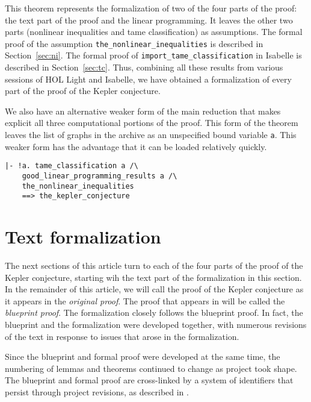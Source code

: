 This theorem represents the formalization of two of the four parts of
the proof: the text part of the proof and the linear programming.  It
leaves the other two parts (nonlinear inequalities and tame
classification) as assumptions.  The formal proof of the assumption
\verb!the_nonlinear_inequalities! is described in
Section~\ref{sec:ni}.  The formal proof of
\verb!import_tame_classification! in Isabelle is described in
Section~\ref{sec:tc}.  Thus, combining all these results from various
sessions of HOL Light and Isabelle, we have obtained a formalization
of every part of the proof of the Kepler conjecture.

We also have an alternative weaker form of the main reduction that
makes explicit all three computational portions of the proof.
This form of the theorem leaves the list of graphs in the archive
as an unspecified bound variable \verb!a!.
This weaker form has the advantage that it can be loaded relatively quickly.

\begin{obeylines}

\begin{verbatim}
|- !a. tame_classification a /\
    good_linear_programming_results a /\ 
    the_nonlinear_inequalities
    ==> the_kepler_conjecture
\end{verbatim}

\end{obeylines}




\section{Text formalization}\label{sec:tf}


The next sections of this article turn to each of the four parts of
the proof of the Kepler conjecture, starting wih the text part of the
formalization in this section.  In the remainder of this article, we
will call the proof of the Kepler conjecture as it appears in
\cite{Hales:2006:DCG} the {\it original proof}.
The proof that appears in \cite{DSP} will be called the {\it blueprint
  proof}.  The formalization closely follows the blueprint proof.  In
fact, the blueprint and the formalization were developed together, with
numerous revisions of the text in response to issues that arose in the
formalization.

Since the blueprint and formal proof were developed at the same time,
the numbering of lemmas and theorems continued to change as project
took shape.  The blueprint and formal proof are cross-linked by a
system of identifiers that persist through project revisions, as
described in \cite[\textsection 5]{FlyspeckWiki}.

